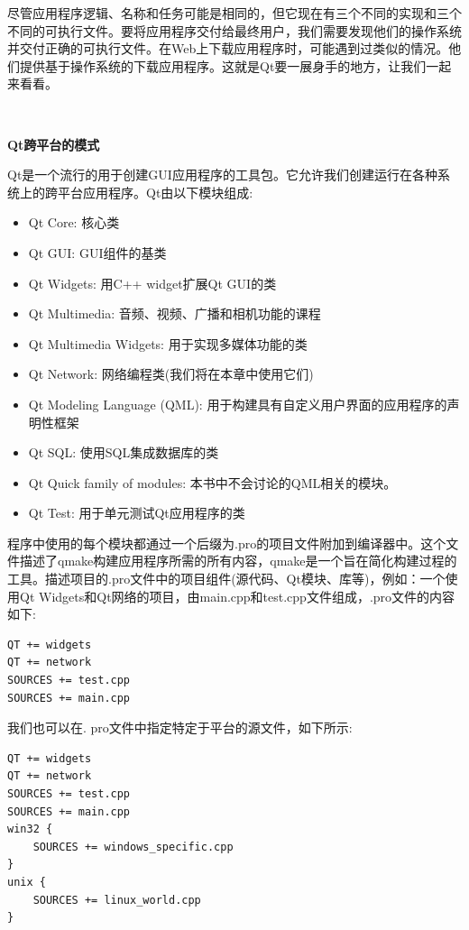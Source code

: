 尽管应用程序逻辑、名称和任务可能是相同的，但它现在有三个不同的实现和三个不同的可执行文件。要将应用程序交付给最终用户，我们需要发现他们的操作系统并交付正确的可执行文件。在Web上下载应用程序时，可能遇到过类似的情况。他们提供基于操作系统的下载应用程序。这就是Qt要一展身手的地方，让我们一起来看看。 \par

\noindent\textbf{}\ \par
\textbf{Qt跨平台的模式} \ \par
Qt是一个流行的用于创建GUI应用程序的工具包。它允许我们创建运行在各种系统上的跨平台应用程序。Qt由以下模块组成: \par

\begin{itemize}
	\item Qt Core: 核心类
	\item Qt GUI: GUI组件的基类
	\item Qt Widgets: 用C++ widget扩展Qt GUI的类
	\item Qt Multimedia: 音频、视频、广播和相机功能的课程
	\item Qt Multimedia Widgets: 用于实现多媒体功能的类
	\item Qt Network: 网络编程类(我们将在本章中使用它们)
	\item Qt Modeling Language (QML): 用于构建具有自定义用户界面的应用程序的声明性框架
	\item Qt SQL: 使用SQL集成数据库的类
	\item Qt Quick family of modules: 本书中不会讨论的QML相关的模块。
	\item Qt Test: 用于单元测试Qt应用程序的类
\end{itemize}

程序中使用的每个模块都通过一个后缀为.pro的项目文件附加到编译器中。这个文件描述了qmake构建应用程序所需的所有内容，qmake是一个旨在简化构建过程的工具。描述项目的.pro文件中的项目组件(源代码、Qt模块、库等)，例如：一个使用Qt Widgets和Qt网络的项目，由main.cpp和test.cpp文件组成，.pro文件的内容如下: \par

\begin{lstlisting}[caption={}]
QT += widgets
QT += network
SOURCES += test.cpp
SOURCES += main.cpp
\end{lstlisting}

我们也可以在. pro文件中指定特定于平台的源文件，如下所示: \par

\begin{lstlisting}[caption={}]
QT += widgets
QT += network
SOURCES += test.cpp
SOURCES += main.cpp
win32 {
	SOURCES += windows_specific.cpp
}
unix {
	SOURCES += linux_world.cpp
}
\end{lstlisting}

